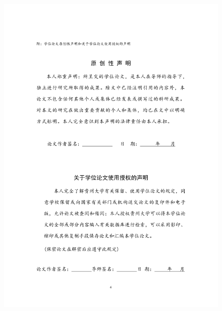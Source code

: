 \documentclass[pdftex,notypeinfo,twoside,openany,UTF8,fntef]{CASthesis}
\numberwithin{algorithm}{chapter}
\theoremstyle{THrm}{
	\newtheorem{question}{问题}[section]
    \newtheorem{problem}{问题}[section]
	\newtheorem{property}{性质}[section]
	\newtheorem{assumption}{假设}[section]
	\newtheorem{claim}[lemma]{断言}
}
\begin{document}
 \pagestyle{empty}
\begin{center}
\begin{figure}
  \centering
  \includegraphics[width=\textwidth]{shengming.pdf}
\end{figure}
\end{center}
\end{document}
